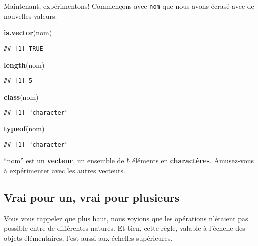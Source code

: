\documentclass[]{book}
\newenvironment{Shaded}{\begin{snugshade}}{\end{snugshade}}
\newcommand{\KeywordTok}[1]{\textcolor[rgb]{0.13,0.29,0.53}{\textbf{#1}}}
\newcommand{\NormalTok}[1]{#1}
\begin{document}
Maintenant, expérimentons! Commençons avec \texttt{nom} que nous avons
écrasé avec de nouvelles valeurs.

\begin{Shaded}
\begin{Highlighting}[]
\KeywordTok{is.vector}\NormalTok{(nom)}
\end{Highlighting}
\end{Shaded}

\begin{verbatim}
## [1] TRUE
\end{verbatim}

\begin{Shaded}
\begin{Highlighting}[]
\KeywordTok{length}\NormalTok{(nom)}
\end{Highlighting}
\end{Shaded}

\begin{verbatim}
## [1] 5
\end{verbatim}

\begin{Shaded}
\begin{Highlighting}[]
\KeywordTok{class}\NormalTok{(nom)}
\end{Highlighting}
\end{Shaded}

\begin{verbatim}
## [1] "character"
\end{verbatim}

\begin{Shaded}
\begin{Highlighting}[]
\KeywordTok{typeof}\NormalTok{(nom)}
\end{Highlighting}
\end{Shaded}

\begin{verbatim}
## [1] "character"
\end{verbatim}

``nom'' est un \textbf{vecteur}, un ensemble de \textbf{5} éléments en
\textbf{charactères}. Amusez-vous à expérimenter avec les autres
vecteurs.

\subsection{Vrai pour un, vrai pour
plusieurs}\label{vrai-pour-un-vrai-pour-plusieurs}

Vous vous rappelez que plus haut, nous voyions que les opérations
n'étaient pas possible entre de différentes natures. Et bien, cette
règle, valable à l'échelle des objets élémentaires, l'est aussi aux
échelles supérieures.
\end{document}

